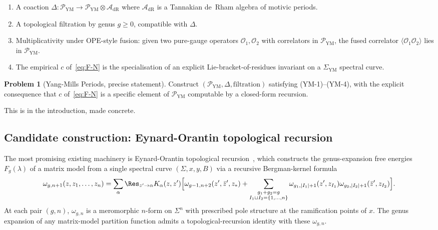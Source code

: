 \documentclass[11pt]{amsart}
\theoremstyle{definition}
\newtheorem{problem}[theorem]{Problem}
\theoremstyle{remark}
\begin{document}
\begin{enumerate}
\item[\textup{(YM-1)}] A coaction
$\Delta : \mathcal{P}_{\mathrm{YM}} \to \mathcal{P}_{\mathrm{YM}}
\otimes \mathcal{A}_{\mathrm{dR}}$ where
$\mathcal{A}_{\mathrm{dR}}$ is a Tannakian de~Rham algebra of motivic
periods.
\item[\textup{(YM-2)}] A topological filtration by genus $g \geq 0$,
compatible with $\Delta$.
\item[\textup{(YM-3)}] Multiplicativity under OPE-style fusion: given
two pure-gauge operators $\mathcal{O}_1, \mathcal{O}_2$ with
correlators in $\mathcal{P}_{\mathrm{YM}}$, the fused correlator
$\langle \mathcal{O}_1 \mathcal{O}_2 \rangle$ lies in
$\mathcal{P}_{\mathrm{YM}}$.
\item[\textup{(YM-4)}] The empirical $c$ of~\eqref{eq:F-N} is the
specialisation of an explicit Lie-bracket-of-residues invariant on a
$\Sigma_{\mathrm{YM}}$ spectral curve.
\end{enumerate}

\begin{problem}[Yang-Mills Periods, precise statement]\label{prob:YM-precise}
Construct $(\mathcal{P}_{\mathrm{YM}}, \Delta, \text{filtration})$
satisfying (YM-1)--(YM-4), with the explicit consequence that
$c$ of~\eqref{eq:F-N} is a specific element of
$\mathcal{P}_{\mathrm{YM}}$ computable by a closed-form recursion.
\end{problem}

This is  in the introduction, made concrete.

\subsection{Candidate construction: Eynard-Orantin topological recursion}
\label{ss:eynard-orantin}
The most promising existing machinery is Eynard-Orantin topological
recursion~\cite{EynardOrantin2007}, which constructs the genus-expansion
free energies $F_g(\lambda)$ of a matrix model from a single spectral
curve $(\Sigma, x, y, B)$ via a recursive Bergman-kernel formula
\begin{equation}\label{eq:EO-recursion}
\omega_{g, n+1}(z, z_1, \dots, z_n) = \sum_{\alpha} \Res_{z' \to \alpha}
K_\alpha(z, z') \Bigl[\omega_{g-1, n+2}(z', \bar{z}', z_*) +
\sum_{\substack{g_1 + g_2 = g \\ I_1 \sqcup I_2 = \{1, \dots, n\}}}
\omega_{g_1, |I_1|+1}(z', z_{I_1}) \omega_{g_2, |I_2|+1}(\bar{z}',
z_{I_2})\Bigr].
\end{equation}
At each pair $(g, n)$, $\omega_{g,n}$ is a meromorphic $n$-form on
$\Sigma^n$ with prescribed pole structure at the ramification points
of $x$. The genus expansion of any matrix-model partition function
admits a topological-recursion identity with these $\omega_{g, n}$.
\end{document}
